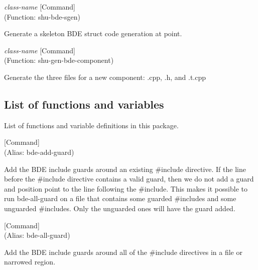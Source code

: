 \vspace{1em}
\noindent
{}
\usebox{\funcname}\emph{class-name}
 \hfill [Command]\\%
 (Function: shu-bde-sgen)

\begin{doc-string}
Generate a skeleton BDE struct code generation at point.
\end{doc-string}

\vspace{1em}
\noindent
{}
\usebox{\funcname}\emph{class-name}
 \hfill [Command]\\%
 (Function: shu-gen-bde-component)

\begin{doc-string}
Generate the three files for a new component: .cpp, .h, and .t.cpp
\end{doc-string}

\subsection{List of functions and variables}

List of functions and variable definitions in this package.



\vspace{1em}
\noindent
{}
\usebox{\funcname}
 \hfill [Command]\\%
 (Alias: bde-add-guard)

\begin{doc-string}
Add the BDE include guards around an existing \#include directive.  If the line
before the \#include directive contains a valid guard, then we do not add a guard
and position point to the line following the \#include.  This makes it possible to
run bde-all-guard on a file that contains some guarded \#includes and some unguarded
\#includes.  Only the unguarded ones will have the guard added.
\end{doc-string}

\vspace{1em}
\noindent
{}
\usebox{\funcname}
 \hfill [Command]\\%
 (Alias: bde-all-guard)

\begin{doc-string}
Add the BDE include guards around all of the \#include directives in a file
or narrowed region.
\end{doc-string}

